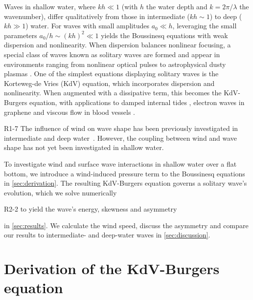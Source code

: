 \documentclass{jfm}
\begin{document}
Waves in shallow water, where $kh \ll 1$ (with $h$ the water depth and
$k=2\pi/\lambda$ the wavenumber), differ qualitatively from those in
intermediate ($kh \sim 1$) to deep ($kh \gg 1$) water.
For waves with small amplitudes $a_0 \ll h$,
leveraging the small parameters $a_0/h \sim (kh)^2 \ll 1$
yields the Boussinesq equations with weak dispersion and nonlinearity.
When dispersion balances nonlinear
focusing, a special class of waves known as solitary waves are formed
and appear in environments ranging from nonlinear optical pulses
\citep[\eg][]{kivshar1993dark} to astrophysical dusty plasmas
\citep[\eg][]{sahu2012nonextensive}.
One of the simplest equations displaying solitary waves is the
Korteweg-de Vries (KdV) equation, which incorporates dispersion and
nonlinearity.
When augmented with a dissipative term, this becomes the KdV-Burgers
equation, with applications to damped internal tides
\citep[\eg][]{sandstrom1995dissipation}, electron waves in graphene
\citep[\eg][]{zdyrski2019effects} and viscous flow in blood vessels
\citep[\eg][]{antar1999weakly}.

\begin{LineLabel}{R1-7}
The influence of wind on wave shape has been previously investigated in
intermediate and deep water~\citep{zdyrski2020wind}.
However, the coupling between wind and wave shape has not yet been
investigated in shallow water.
\end{LineLabel}
To investigate wind and surface wave interactions in shallow water over
a flat bottom, we introduce a wind-induced pressure term to the
Boussinesq equations in \cref{sec:derivation}.
The resulting KdV-Burgers equation governs a solitary wave's evolution,
which we solve numerically
\begin{LineLabel}{R2-2}
to yield the wave's energy, skewness and asymmetry
\end{LineLabel}
in \cref{sec:results}.
We calculate the wind speed, discuss the asymmetry and
compare our results to intermediate- and deep-water waves in
\cref{sec:discussion}.

\section{\label{sec:derivation} Derivation of the KdV-Burgers equation}
\end{document}
